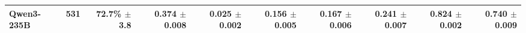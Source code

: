 \begin{table}[t]
\begin{tabular*}{\textwidth}{@{\extracolsep{\fill}}lrrrrrrrrr@{}}
Qwen3-235B & 531 & \shortstack[r]{72.7\%\\{\scriptsize $\pm$3.8}} & \shortstack[r]{0.374\\{\scriptsize $\pm$0.008}} & \shortstack[r]{0.025\\{\scriptsize $\pm$0.002}} & \shortstack[r]{0.156\\{\scriptsize $\pm$0.005}} & \shortstack[r]{0.167\\{\scriptsize $\pm$0.006}} & \shortstack[r]{0.241\\{\scriptsize $\pm$0.007}} & \shortstack[r]{0.824\\{\scriptsize $\pm$0.002}} & \shortstack[r]{0.740\\{\scriptsize $\pm$0.009}} \\
\bottomrule
\end{tabular*}
\end{table}
